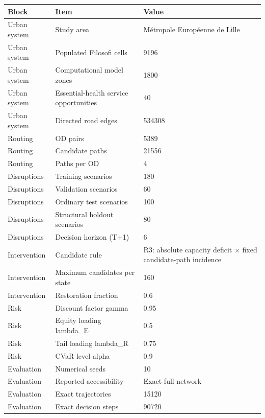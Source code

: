 \begin{tabular}{lll}
\toprule
Block & Item & Value \\
\midrule
Urban system & Study area & Métropole Européenne de Lille \\
Urban system & Populated Filosofi cells & 9196 \\
Urban system & Computational model zones & 1800 \\
Urban system & Essential-health service opportunities & 40 \\
Urban system & Directed road edges & 534308 \\
Routing & OD pairs & 5389 \\
Routing & Candidate paths & 21556 \\
Routing & Paths per OD & 4 \\
Disruptions & Training scenarios & 180 \\
Disruptions & Validation scenarios & 60 \\
Disruptions & Ordinary test scenarios & 100 \\
Disruptions & Structural holdout scenarios & 80 \\
Disruptions & Decision horizon (T+1) & 6 \\
Intervention & Candidate rule & R3: absolute capacity deficit × fixed candidate-path incidence \\
Intervention & Maximum candidates per state & 160 \\
Intervention & Restoration fraction & 0.6 \\
Risk & Discount factor gamma & 0.95 \\
Risk & Equity loading lambda\_E & 0.5 \\
Risk & Tail loading lambda\_R & 0.75 \\
Risk & CVaR level alpha & 0.9 \\
Evaluation & Numerical seeds & 10 \\
Evaluation & Reported accessibility & Exact full network \\
Evaluation & Exact trajectories & 15120 \\
Evaluation & Exact decision steps & 90720 \\
\bottomrule
\end{tabular}
